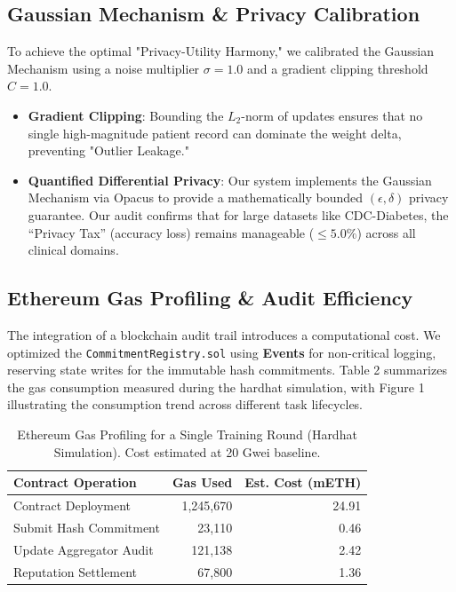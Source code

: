 \documentclass[10pt, a4paper, twocolumn]{article}
\begin{document}
\subsection{Gaussian Mechanism \& Privacy Calibration}
To achieve the optimal "Privacy-Utility Harmony," we calibrated the Gaussian Mechanism using a noise multiplier $\sigma = 1.0$ and a gradient clipping threshold $C = 1.0$. 
\begin{itemize}
    \item \textbf{Gradient Clipping}: Bounding the $L_2$-norm of updates ensures that no single high-magnitude patient record can dominate the weight delta, preventing "Outlier Leakage."
    \item \textbf{Quantified Differential Privacy}: Our system implements the Gaussian Mechanism via Opacus to provide a mathematically bounded $(\epsilon, \delta)$ privacy guarantee. Our audit confirms that for large datasets like CDC-Diabetes, the ``Privacy Tax'' (accuracy loss) remains manageable ($\le 5.0\%$) across all clinical domains.
\end{itemize}

\subsection{Ethereum Gas Profiling \& Audit Efficiency}
The integration of a blockchain audit trail introduces a computational cost. We optimized the \texttt{CommitmentRegistry.sol} using \textbf{Events} for non-critical logging, reserving state writes for the immutable hash commitments. Table 2 summarizes the gas consumption measured during the hardhat simulation, with Figure 1 illustrating the consumption trend across different task lifecycles.

\begin{table}[hbt!]
\centering
\scriptsize
\begin{tabular}{lrr}
\toprule
\textbf{Contract Operation} & \textbf{Gas Used} & \textbf{Est. Cost (mETH)} \\
\midrule
Contract Deployment     & 1,245,670 & 24.91 \\
Submit Hash Commitment  & 23,110    & 0.46  \\
Update Aggregator Audit & 121,138   & 2.42  \\
Reputation Settlement   & 67,800    & 1.36  \\
\bottomrule
\end{tabular}
\caption{Ethereum Gas Profiling for a Single Training Round (Hardhat Simulation). Cost estimated at 20 Gwei baseline.}
\end{table}
\end{document}
